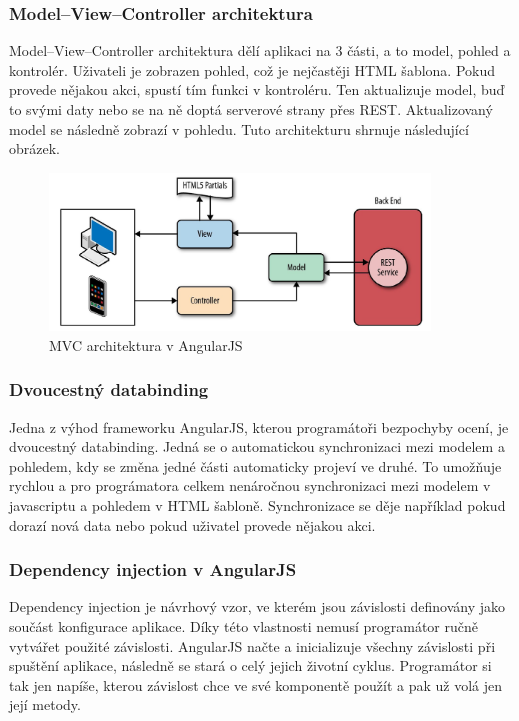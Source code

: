 \documentclass[czech,master,public,dept460,male,cpdeclaration,twoside]{diploma}
\begin{document}
\subsubsection{Model–View–Controller architektura}
Model–View–Controller architektura dělí aplikaci na 3 části, a to model, pohled a kontrolér. Uživateli je zobrazen pohled, což je nejčastěji HTML šablona. Pokud provede nějakou akci, spustí tím funkci v kontroléru. Ten aktualizuje model, buď to svými daty nebo se na ně doptá serverové strany přes REST. Aktualizovaný model se následně zobrazí v pohledu. Tuto architekturu shrnuje následující obrázek.
\begin{figure}[H]
\centering\includegraphics[width=0.9\textwidth]{Figures/MVC.png}\caption{MVC architektura v AngularJS}
\end{figure}

\subsubsection{Dvoucestný databinding}
Jedna z výhod frameworku AngularJS, kterou programátoři bezpochyby ocení, je dvoucestný databinding. Jedná se o automatickou synchronizaci mezi modelem a pohledem, kdy se změna jedné části automaticky projeví ve druhé. To umožňuje rychlou a pro prográmatora celkem nenáročnou synchronizaci mezi modelem v javascriptu a pohledem v HTML šabloně. Synchronizace se děje například pokud dorazí nová data nebo pokud uživatel provede nějakou akci. \cite{databinding}

\subsubsection{Dependency injection v AngularJS}
Dependency injection je návrhový vzor, ve kterém jsou závislosti definovány jako součást konfigurace aplikace. Díky této vlastnosti nemusí programátor ručně vytvářet použité závislosti. AngularJS načte a inicializuje všechny závislosti při spuštění aplikace, následně se stará o celý jejich životní cyklus. Programátor si tak jen napíše, kterou závislost chce ve své komponentě použít a pak už volá jen její metody.
\end{document}
